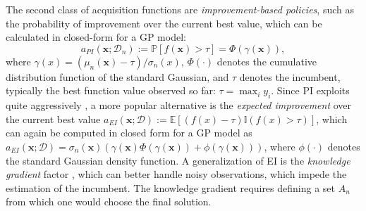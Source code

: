 \documentclass[10pt,letterpaper]{article} %
\begin{document}
The second class of acquisition functions are \emph{improvement-based policies}, such as the probability of improvement \citep[PI,][]{kushner_new_1964} over the current best value, which can be calculated in closed-form for a GP model:
$$a_{PI}(\mathbf{x}; \mathcal{D}_n) := \mathbb{P}[f(\mathbf{x}) > \tau] = \Phi(\gamma(\mathbf{x})),$$
where $\gamma(x) = (\mu_n(\mathbf{x}) - \tau) / \sigma_n(x)$, $\Phi(\cdot)$ denotes the cumulative distribution function of the
standard Gaussian, and $\tau$ denotes the incumbent, typically the best function value observed so far: $\tau = \max_i y_i$.
Since PI exploits quite aggressively \cite{jones_taxonomy_2001}, a more popular
alternative is the \emph{expected improvement} \citep[EI,][]{mockus_application_1978} over the
current best value $ a_{EI}(\mathbf{x}; \mathcal{D}) := \mathbb{E}[(f(x) - \tau)\mathbb{I}(f(x) > \tau)]$, which can again be computed in closed form for a GP model as
$a_{EI}(\mathbf{x}; \mathcal{D})
  = \sigma_n(\mathbf{x})\left(\gamma(\mathbf{x})\Phi(\gamma(\mathbf{x})) + \phi(\gamma(\mathbf{x}))\right)$,
where $\phi(\cdot)$ denotes the standard Gaussian density function.  A
generalization of EI is the \emph{knowledge gradient} factor \cite
{frazier_knowledge-gradient_2009}, which can better handle noisy observations,
which impede the estimation of the incumbent. The knowledge gradient requires
defining a set $A_n$ from which one would choose the final solution.
\end{document}
